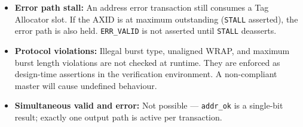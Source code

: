 \documentclass[11pt,a4paper]{article}
\begin{document}
\begin{itemize}
  \item \textbf{Error path stall:} An address error transaction still
        consumes a Tag Allocator slot. If the AXID is at maximum
        outstanding (\texttt{STALL} asserted), the error path is also
        held. \texttt{ERR\_VALID} is not asserted until \texttt{STALL}
        deasserts.
  \item \textbf{Protocol violations:} Illegal burst type, unaligned
        WRAP, and maximum burst length violations are not checked at
        runtime. They are enforced as design-time assertions in the
        verification environment. A non-compliant master will cause
        undefined behaviour.
  \item \textbf{Simultaneous valid and error:} Not possible —
        \texttt{addr\_ok} is a single-bit result; exactly one output
        path is active per transaction.
\end{itemize}
\end{document}
